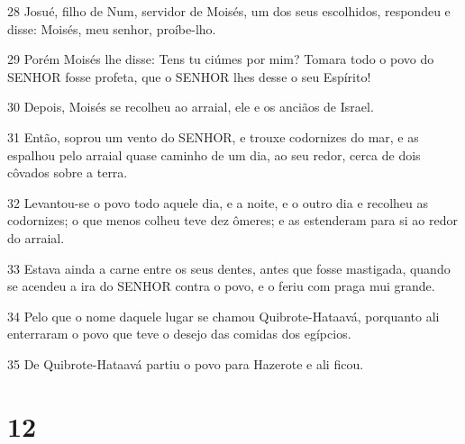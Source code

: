 \par 28 Josué, filho de Num, servidor de Moisés, um dos seus escolhidos, respondeu e disse: Moisés, meu senhor, proíbe-lho.
\par 29 Porém Moisés lhe disse: Tens tu ciúmes por mim? Tomara todo o povo do SENHOR fosse profeta, que o SENHOR lhes desse o seu Espírito!
\par 30 Depois, Moisés se recolheu ao arraial, ele e os anciãos de Israel.
\par 31 Então, soprou um vento do SENHOR, e trouxe codornizes do mar, e as espalhou pelo arraial quase caminho de um dia, ao seu redor, cerca de dois côvados sobre a terra.
\par 32 Levantou-se o povo todo aquele dia, e a noite, e o outro dia e recolheu as codornizes; o que menos colheu teve dez ômeres; e as estenderam para si ao redor do arraial.
\par 33 Estava ainda a carne entre os seus dentes, antes que fosse mastigada, quando se acendeu a ira do SENHOR contra o povo, e o feriu com praga mui grande.
\par 34 Pelo que o nome daquele lugar se chamou Quibrote-Hataavá, porquanto ali enterraram o povo que teve o desejo das comidas dos egípcios.
\par 35 De Quibrote-Hataavá partiu o povo para Hazerote e ali ficou.

\chapter{12}

